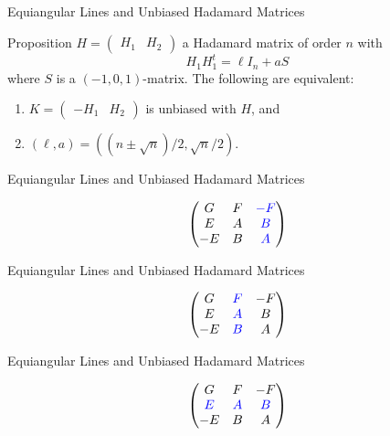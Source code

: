 \documentclass{beamer}
\newcommand{\bblue}[1]{\textcolor{blue}{#1}}
\begin{document}
\begin{frame}{Equiangular Lines and Unbiased Hadamard Matrices}

  \begin{block}{Proposition \cite[][]{splittable-hadamard}}
    $H = \left( \begin{smallmatrix} H_1 & H_2 \end{smallmatrix} \right)$ a
    Hadamard matrix of order $n$ with
    \[
      H_1H_1^t = \ell I_n + aS
    \]
    where $S$ is a $(-1,0,1)$-matrix. The following are equivalent:
    \begin{enumerate}
      \item $K = \left( \begin{smallmatrix} -H_1 & H_2 \end{smallmatrix}
        \right)$ is unbiased with $H$, and
      \item $(\ell,a) = ((n \pm \sqrt{n})/2,\sqrt{n}/2)$.
    \end{enumerate}
  \end{block}
  
\end{frame}

\begin{frame}{Equiangular Lines and Unbiased Hadamard Matrices}

  \[
    \begin{pmatrix}
      G & F & \bblue{-F} \\
      E & A & \bblue{B} \\
      -E & B & \bblue{A}
    \end{pmatrix}
  \]
  
\end{frame}

\begin{frame}{Equiangular Lines and Unbiased Hadamard Matrices}

  \[
    \begin{pmatrix}
      G & \bblue{F} & -F \\
      E & \bblue{A} & B \\
      -E & \bblue{B} & A
    \end{pmatrix}
  \]
  
\end{frame}

\begin{frame}{Equiangular Lines and Unbiased Hadamard Matrices}

  \[
    \begin{pmatrix}
      G & F & -F \\
      \bblue{E} & \bblue{A} & \bblue{B} \\
      -E & B & A
    \end{pmatrix}
  \]
  
\end{frame}
\end{document}
